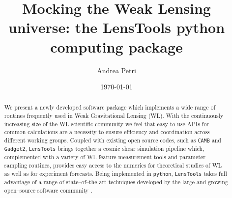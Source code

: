 \documentclass[reprint,aps,prd,superscriptaddress,showkeys,showpacs]{revtex4-1}
\newcommand{\ttt}[1]{\texttt{#1}}
\newcommand{\LT}{\texttt{LensTools} }
\begin{document}
\title{Mocking the Weak Lensing universe: the LensTools python computing package}

\author{Andrea Petri}

\date{\today}

\label{firstpage}

\begin{abstract}
We present a newly developed software package which implements a wide range of routines frequently used in Weak Gravitational Lensing (WL). With the continuously increasing size of the WL scientific community we feel that easy to use APIs for common calculations are a necessity to ensure efficiency and coordination across different working groups. Coupled with existing open source codes, such as \ttt{CAMB}\citep{CAMB} and \ttt{Gadget2}\citep{Gadget2}, \LT brings together a cosmic shear simulation pipeline which, complemented with a variety of WL feature measurement tools and parameter sampling routines, provides easy access to the numerics for theoretical studies of WL as well as for experiment forecasts. Being implemented in \ttt{python}\citep{python}, \LT takes full advantage of a range of state--of--the art techniques developed by the large and growing open--source software community \citep{scipy,pandas,astropy,scikit-learn,emcee}.    
    
\end{abstract}



\maketitle


\end{document}

